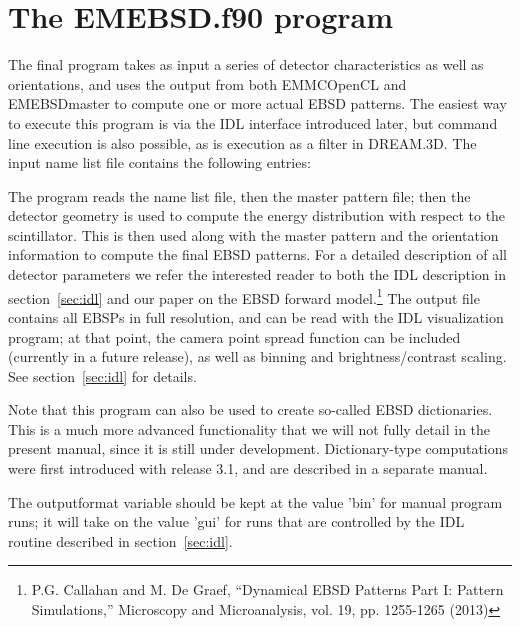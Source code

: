 \documentclass[DIV=calc, paper=letter, fontsize=11pt]{scrartcl}	 %
\begin{document}
\section{The \protect\textsf{EMEBSD.f90} program\label{sec:f90EBSD}}
The final program takes as input a series of detector characteristics as well as orientations, and uses the output from both \textsf{EMMCOpenCL} and
\textsf{EMEBSDmaster} to compute one or more actual EBSD patterns.  
The easiest way to execute this program is via the IDL interface introduced later, but command line execution is also possible, as is execution as a filter in \textsf{DREAM.3D}.  
The input name list file contains the following entries:

The program reads the name list file, then the master pattern file;  then the detector geometry is used to
compute the energy distribution with respect to the scintillator.  This is then used along with the master pattern and the 
orientation information to compute the final EBSD patterns.  For a detailed description of all detector parameters we 
refer the interested reader to both the IDL description in section~\ref{sec:idl} and our paper on the EBSD forward model.\footnote{P.G. Callahan and M. De Graef, 
``Dynamical EBSD Patterns Part I: Pattern Simulations,'' Microscopy and Microanalysis, vol. 19, pp. 1255-1265 (2013)}
The output file contains all EBSPs in full resolution,
and can be read with the IDL visualization program; at that point, the camera point spread function can be included (currently in a future release), as well
as binning and brightness/contrast scaling. See section~\ref{sec:idl} for details.

Note that this program can also be used to create so-called EBSD dictionaries.  This is a much more advanced functionality 
that we will not fully detail in the present manual, since it is still under development. Dictionary-type 
computations were first introduced with release 3.1, and are described in a separate manual.

The \textsf{outputformat} variable should be kept at the value \textsf{'bin'} for manual program runs; it will take on 
the value \textsf{'gui'} for runs that are controlled by the IDL routine described in section~\ref{sec:idl}.  
\end{document}
